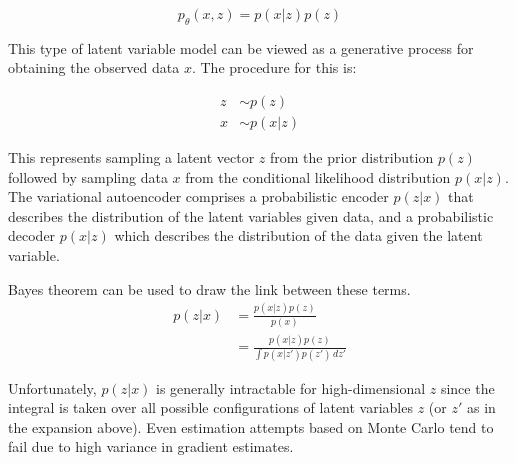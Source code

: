 $$
  p_{\theta}(x,z) = p(x|z)p(z)
$$



This type of latent variable model can be viewed as a generative process for obtaining the observed data $x$. The procedure for this is:


$$
\begin{aligned}
  z &\sim p(z) \\
  x &\sim p(x|z)
\end{aligned}
$$

This represents sampling a latent vector $z$ from the prior distribution $p(z)$ followed by sampling data $x$ from the conditional likelihood distribution $p(x|z)$. The variational autoencoder comprises a probabilistic encoder $p(z|x)$ that describes the distribution of the latent variables given data, and a probabilistic decoder $p(x|z)$ which describes the distribution of the data given the latent variable. 


Bayes theorem can be used to draw the link between these terms. 
$$
\begin{aligned}
  p(z|x) 
  &= \frac{p(x|z)p(z)}{p(x)} \\
  &= \frac{p(x|z)p(z)}{\int p(x|z')p(z') \,dz'}
\end{aligned}
$$

Unfortunately, $p(z|x)$ is generally intractable for high-dimensional $z$ since the integral is taken over all possible configurations of latent variables $z$ (or $z'$ as in the expansion above). Even estimation attempts based on Monte Carlo tend to fail due to high variance in gradient estimates. %


